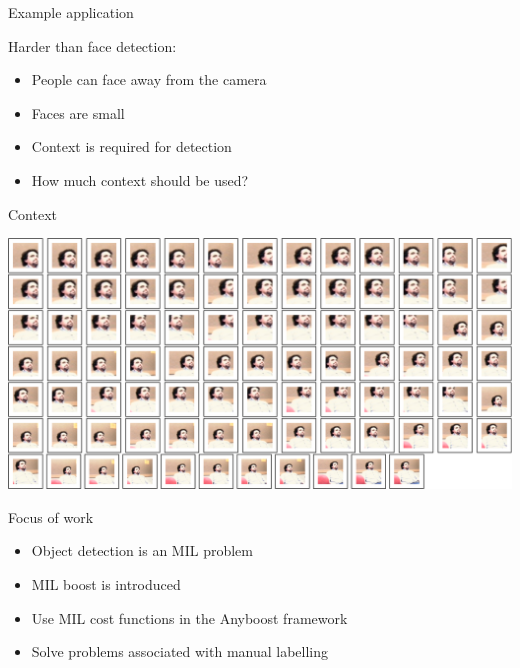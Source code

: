 \documentclass{beamer}
\begin{document}
	\begin{frame}{Example application}

			Harder than face detection:

			\begin{itemize}
				\item People can face away from the camera
				\item Faces are small
				\item Context is required for detection
				\item How much context should be used?
			\end{itemize}

	\end{frame}

	\begin{frame}{Context}
		\begin{center}
			\includegraphics[width=1\textwidth]{windows.png}
		\end{center}
	\end{frame}


	\begin{frame}{Focus of work}

			\begin{itemize}
				\item Object detection is an MIL problem
				\item MIL boost is introduced
				\item Use MIL cost functions in the Anyboost framework
				\item Solve problems associated with manual labelling
			\end{itemize}

	\end{frame}
\end{document}
